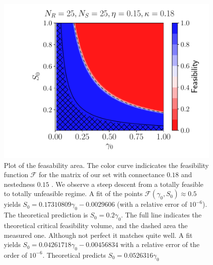 \documentclass[12pt, titlepage]{report}
\begin{document}
\begin{figure}
\centering
\includegraphics{Results/typical_feasibility_volume}
\caption{Plot of the feasability area. The color curve indicicates the feasibility function $\mathcal{F}$ for the matrix of our set with connectance $0.18$ and nestedness $0.15$ . We observe a steep descent from a totally feasible to totally unfeasible regime. A fit of the points $\mathcal{F}(\gamma_0, S_0) \approx 0.5 $ yields $S_0 = 0.17310809 \gamma_0 -0.0029606$
(with a relative error of $10^{-6}$). The theoretical prediction is $S_0 = 0.2 \gamma_0$. The full line indicates the theoretical critical feasibility volume, and the dashed area the measured one. Although not perfect it matches quite well. A fit yields $S_0 = 0.04261718 \gamma_0 -0.00456834$ with a relative error of the order of $10^{-6}$. Theoretical predicts $S_0=0.0526316 \gamma_0$}
\end{figure}
\end{document}
